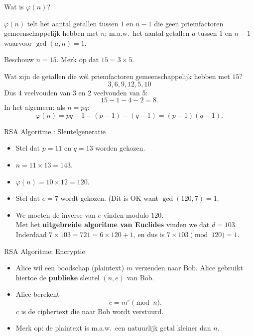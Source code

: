\documentclass{beamer}
\begin{document}
\begin{frame}{Wat is $\varphi(n)$?}

$\varphi(n)$ telt het aantal getallen tussen $1$ en $n-1$ die geen priemfactoren gemeenschappelijk
hebben met $n$; m.a.w.\ het aantal getallen $a$ tussen $1$ en $n-1$ waarvoor $\gcd(a, n) = 1$.

\vspace{0.5cm}
Beschouw $ n = 15$. Merk op dat $ 15 = 3 \times 5$.

Wat zijn de getallen die w\'el priemfactoren gemeenschappelijk hebben met $15$?
\[
3, 6 , 9, 12, 5, 10
\]
Dus 4 veelvouden van 3 en 2 veelvouden van 5: 
\[
15 - 1 - 4 - 2 = 8.
\]
In het algemeen: als $n = p q$:
\[
\varphi(n) = pq - 1 - (p-1) - (q-1) = (p-1)(q-1).
\]


\end{frame}


%		

\begin{frame}{RSA Algoritme : Sleutelgeneratie}

\begin{itemize}
	\item Stel dat $p = 11$ en $q = 13$ worden gekozen.
	\item $ n = 11 \times 13 = 143$.
	\item $\varphi(n) = 10 \times 12 = 120$.
	\item Stel dat $e = 7$ wordt gekozen. (Dit is OK want $\gcd(120, 7) = 1$.
	\item We moeten de inverse van $e$ vinden modulo $120$. \\
	 Met het \textbf{uitgebreide algoritme van Euclides} vinden we dat $d = 103$.\\
	 Inderdaad $ 7 \times 103 = 721 = 6 \times 120 + 1$, en dus is 
	 $7 \times 103 \pmod{120} = 1$.
	  
\end{itemize}
\end{frame}

\begin{frame}{RSA Algoritme: Encryptie}
\begin{itemize}
	\item Alice wil een boodschap (plaintext) $m$ verzenden naar Bob. Alice gebruikt hiertoe de \textbf{publieke} sleutel $(n, e)$ van Bob.
	\item Alice berekent
	\[
	 c = m^e \pmod{n}.
	\]
	$c$ is de ciphertext die naar Bob wordt verstuurd.
	\item Merk op: de plaintext is m.a.w.\ een natuurlijk getal
	kleiner dan $n$.
\end{itemize}
\end{frame}
\end{document}
